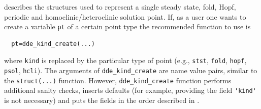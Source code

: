 \documentclass[10pt]{scrartcl}
\newcommand{\blist}[1]{\mbox{\lstinline!#1!}}
\begin{document}
 describes the structures used to
represent a single steady state, fold, Hopf, 
periodic and homoclinic/heteroclinic solution point. If, as a user one
wants to create a variable \blist{pt} of a certain point type the recommended function to use is
\begin{lstlisting}
  pt=dde_kind_create(...)
\end{lstlisting}
where \blist{kind} is replaced by the particular type of point (e.g.,
\blist{stst}, \blist{fold}, \blist{hopf}, \blist{psol},
\blist{hcli}). The arguments of \blist{dde_kind_create} are name value
pairs, similar to the \blist{struct(...)} function. However,
\blist{dde_kind_create} function performs additional sanity checks,
inserts defaults (for example, providing the field \blist{'kind'} is
not necessary) and puts the fields in the order described in .
\end{document}
